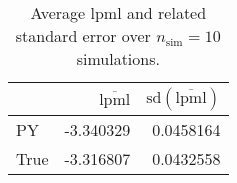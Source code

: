 \begin{table}[H]

\caption{Average lpml and related standard error over $n_{\text{sim}} = 10$ simulations.}
\centering
\begin{tabular}[t]{lrr}
\toprule
  & $\overbar{\text{lpml}}$ & $\text{sd}(\overbar{\text{lpml}})$\\
\midrule
PY & -3.340329 & 0.0458164\\
True & -3.316807 & 0.0432558\\
\bottomrule
\end{tabular}
\end{table}